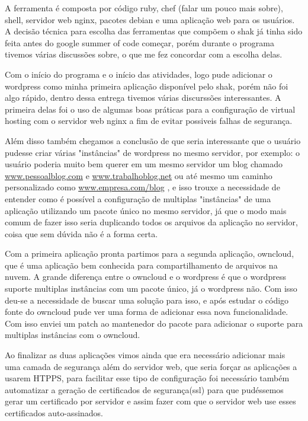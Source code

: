 A ferramenta é composta por código ruby, chef (falar um pouco mais sobre), shell,
servidor web nginx, pacotes debian e uma aplicação web para os usuários. A decisão
técnica para escolha das ferramentas que compõem o shak já tinha sido feita antes do google summer of
code começar, porém durante o programa tivemos várias discussões sobre, o que me
fez concordar com a escolha delas.

Com o início do programa e o início das atividades, logo pude adicionar o wordpress
como minha primeira aplicação disponível pelo shak, porém não foi algo rápido, dentro
dessa entrega tivemos várias discurssões interessantes. A primeira delas foi
o uso de algumas boas práticas para a configuração de virtual hosting com  o
servidor web nginx a fim de evitar possiveis falhas de segurança.

Além disso também chegamos a conclusão de que seria interessante que o usuário pudesse
criar várias "instâncias" de wordpress no mesmo servidor, por exemplo: o usuário
poderia muito bem querer em um mesmo servidor um blog chamado \url{www.pessoalblog.com}
e \url{www.trabalhoblog.net} ou até mesmo um caminho personalizado como \url{www.empresa.com/blog}
, e isso trouxe a necessidade de entender como é possível
a configuração de multiplas "instâncias" de uma aplicação utilizando um pacote
único no mesmo servidor, já que o modo mais comum de fazer isso seria duplicando
 todos os arquivos da aplicação no servidor, coisa que sem dúvida não é a forma certa.

Com a primeira aplicação pronta partimos para a segunda aplicação, owncloud, que
é uma aplicação bem conhecida para compartilhamento de arquivos na nuvem. A grande
diferença entre o owncloud e o wordpress é que o wordpress suporte multiplas
instâncias com um pacote único, já o wordpress não. Com isso deu-se a necessidade de
buscar uma solução para isso, e após estudar o código fonte do owncloud pude
ver uma forma de adicionar essa nova funcionalidade. Com isso enviei um
patch ao mantenedor do pacote para adicionar o suporte para multiplas instâncias
com o owncloud.

Ao finalizar as duas aplicações vimos ainda que era necessário adicionar mais
uma camada de segurança além do servidor web, que seria forçar as aplicações
a usarem HTPPS, para facilitar esse tipo de configuração foi necessário também
automatizar a geração de certificados de segurança(ssl) para que pudéssemos gerar
um certificado por servidor e assim fazer com que o servidor web use esses certificados
auto-assinados.

